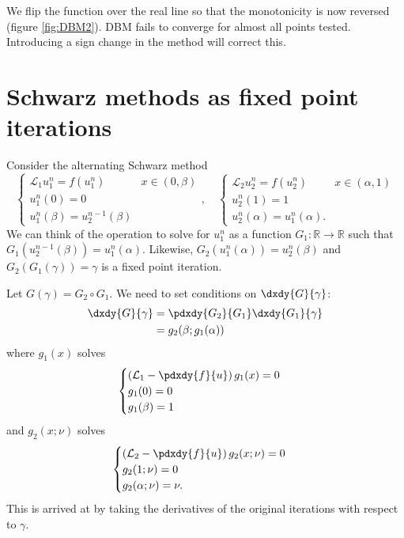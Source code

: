 \documentclass{book}
\begin{document}
We flip the function over the real line so that the monotonicity is now reversed (figure \ref{fig:DBM2}).
DBM fails to converge for almost all points tested.
Introducing a sign change in the method will correct this.

\chapter{Schwarz methods as fixed point iterations}

Consider the alternating Schwarz method
\begin{equation*}
\begin{cases} \mathcal{L}_1 u_1^n = f(u_1^n) & x \in (0,\beta) \\
u_1^n(0) = 0 & \\ u_1^n(\beta) = u_2^{n-1}(\beta) \end{cases}, \quad
\begin{cases} \mathcal{L}_2 u_2^n = f(u_2^n) & x \in (\alpha,1) \\
u_2^n(1) = 1 & \\ u_2^n(\alpha) = u_1^n(\alpha). \end{cases}
\end{equation*}
We can think of the operation to solve for $u_1^n$ as a function $G_1: \mathbb{R} \rightarrow \mathbb{R}$ such that $G_1(u_2^{n-1}(\beta)) = u_1^n(\alpha)$.
Likewise, $G_2(u_1^n(\alpha)) = u_2^n(\beta)$ and $G_2(G_1(\gamma)) = \gamma$ is a fixed point iteration.

Let $G(\gamma) = G_2 \circ G_1$.
We need to set conditions on $\dxdy{G}{\gamma}$:
\begin{align*}
\dxdy{G}{\gamma} & = \pdxdy{G_2}{G_1} \dxdy{G_1}{\gamma} \\
& = g_2(\beta; g_1(\alpha))
\end{align*}
where $g_1(x)$ solves
\begin{equation*}
\begin{cases} \left ( \mathcal{L}_1 - \pdxdy{f}{u} \right ) g_1(x) = 0 \\
g_1(0) = 0 \\ g_1(\beta) = 1 \end{cases}
\end{equation*}
and $g_2(x; \nu)$ solves
\begin{equation*}
\begin{cases} \left ( \mathcal{L}_2 - \pdxdy{f}{u} \right ) g_2(x; \nu) = 0 \\
g_2(1; \nu) = 0 \\ g_2(\alpha; \nu) = \nu. \end{cases}
\end{equation*}
This is arrived at by taking the derivatives of the original iterations with respect to $\gamma$.
\end{document}
